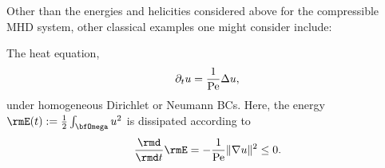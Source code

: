     \line
    
    Other than the energies and helicities considered above for the compressible MHD system, other classical examples one might consider include:
    \begin{example}
        The heat equation,
        \begin{equation}\label{eqn:heat equation}
            \partial_{t}u  =  \frac{1}{\mathrm{Pe}}\Delta u,
        \end{equation}
        under homogeneous Dirichlet or Neumann BCs. Here, the energy $\rmE(t)  :=  \frac{1}{2}\int_{\bfOmega}u^{2}$ is dissipated according to
        \begin{equation}\label{eqn:heat equation dissipation}
            \frac{\rmd}{\rmd t}\rmE  =  - \frac{1}{\rmPe}\|\nabla u\|^{2}  \leq  0.
        \end{equation}
    \end{example}
    
